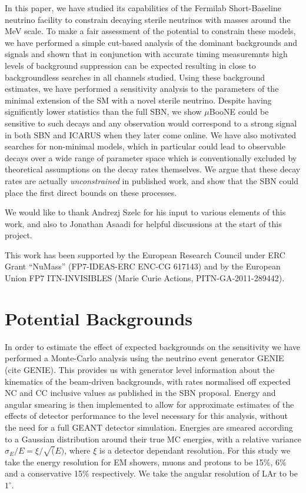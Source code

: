 \documentclass[11pt, a4paper]{article}
\begin{document}
In this paper, we
have studied its capabilities of the Fermilab Short-Baseline neutrino facility to constrain decaying sterile neutrinos with
masses around the MeV scale. To make a fair assessment of the potential to
constrain these models, we have performed a simple cut-based analysis of the dominant
backgrounds and signals and shown that in conjunction with accurate timing measuremnts high levels of background suppression
can be expected resulting in close to backgroundless searches in all channels studied. Using these background estimates,
we have performed a sensitivity analysis to the parameters of the minimal
extension of the SM with a novel sterile neutrino. Despite having significntly lower statistics than the full SBN, we show $\mu$BooNE could be sensitive to such decays and any observation would correspond to a strong signal in both SBN and ICARUS when they later come online.  We have also motivated searches for non-minimal models, which in particular could lead to observable
decays over a wide range of parameter space which is conventionally excluded by
theoretical assumptions on the decay rates themselves. We argue that these
decay rates are actually \emph{unconstrained} in published work, and show that
the SBN could place the first direct bounds on these processes. 

\acknowledgments

We would like to thank Andrezj Szelc for his input to various elements of this
work, and also to Jonathan Asaadi for helpful discussions at the start of this
project.

This work has been supported by the European Research Council under ERC Grant
“NuMass” (FP7-IDEAS-ERC ENC-CG 617143) and by the European Union FP7
ITN-INVISIBLES (Marie Curie Actions, PITN-GA-2011-289442).

\appendix
\section{Potential Backgrounds\label{sec:bg}}
In order to estimate the effect of expected backgrounds on the sensitivity we have performed a Monte-Carlo analysis using the neutrino event generator GENIE (cite GENIE). This provides us with generator level information about the kinematics of the beam-driven backgrounds, with rates normalised off expected NC and CC inclusive values as published in the SBN proposal. Energy and angular smearing is then implemented to allow for approximate estimates of the effects of detector performance to the level necessary for this analysis, without the need for a full GEANT detector simulation. Energies are smeared according to a Gaussian distribution around their true MC energies, with a relative variance $\sigma_E/E = \xi/ \sqrt(E) $, where $\xi$ is a detector dependant resolution. For this study we take the energy resolution for EM showers, muons and protons to be 15\%, 6\% and a conservative 15\% respectively. We take the angular resolution of LAr to be $1^{\circ}$. 
\end{document}
